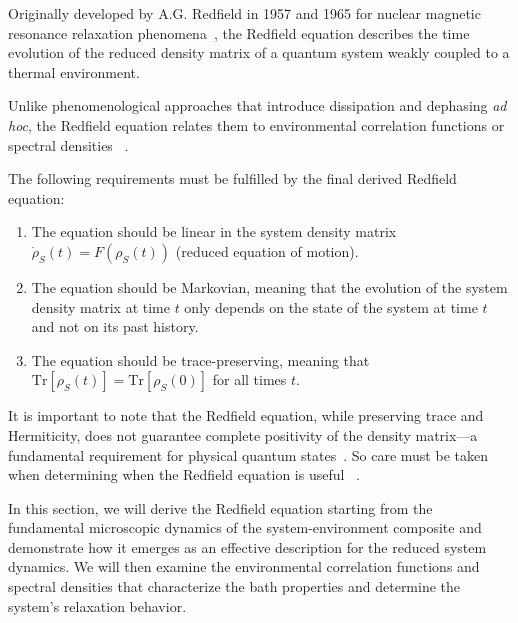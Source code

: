 Originally developed by A.G. Redfield in 1957 and 1965 for nuclear magnetic resonance relaxation phenomena~\cite{redfield1965theoryrelaxationprocesses}, the Redfield equation describes the time evolution of the reduced density matrix of a quantum system weakly coupled to a thermal environment.

\noindent
Unlike phenomenological approaches that introduce dissipation and dephasing \emph{ad hoc}, the Redfield equation relates them to environmental correlation functions or spectral densities ~\cite{breuerpetruccione2009theoryopenquantum, weiss2012quantumdissipativesystems}.

\noindent
The following requirements must be fulfilled by the final derived Redfield equation:

\begin{enumerate}
	\item The equation should be linear in the system density matrix $\dot{\rho}_S(t) = F(\rho_S(t))$ (reduced equation of motion).
	\item The equation should be Markovian, meaning that the evolution of the system density matrix at time $t$ only depends on the state of the system at time $t$ and not on its past history.
	\item The equation should be trace-preserving, meaning that $\mathrm{Tr}[\rho_S(t)] = \mathrm{Tr}[\rho_S(0)]$ for all times $t$.
\end{enumerate}

It is important to note that the Redfield equation, while preserving trace and Hermiticity, does not guarantee complete positivity of the density matrix—a fundamental requirement for physical quantum states~\cite{rivasetal2010markovianmasterequations}. 
So care must be taken when determining when the Redfield equation is useful ~\cite{redfield1965theoryrelaxationprocesses, rivasetal2014quantumnonmarkovianitycharacterization, lietal2018conceptsquantumnonmarkovianity}.


\noindent
In this section, we will derive the Redfield equation starting from the fundamental microscopic dynamics of the system-environment composite and demonstrate how it emerges as an effective description for the reduced system dynamics. We will then examine the environmental correlation functions and spectral densities that characterize the bath properties and determine the system's relaxation behavior.

